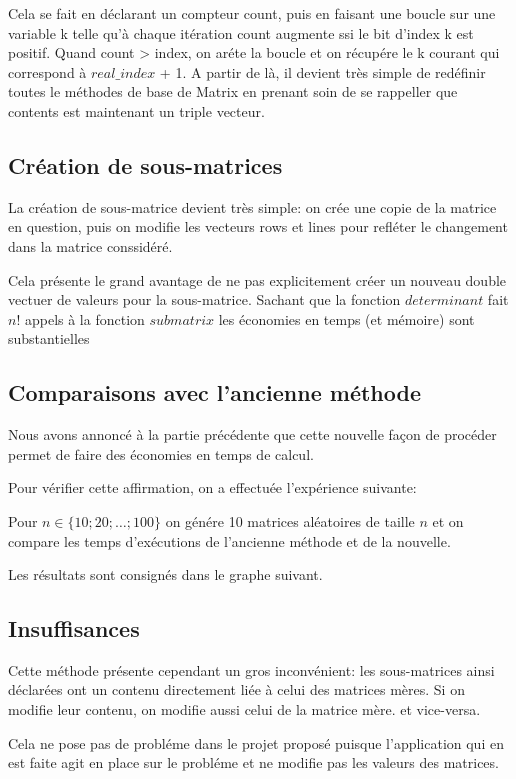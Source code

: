 \documentclass[a4paper,11pt]{article}
\begin{document}
Cela se fait en déclarant un compteur count, puis en faisant une boucle sur une variable k telle qu'à chaque itération count augmente ssi le bit d'index k est positif. Quand count > index, on aréte la boucle
et on récupére le k courant qui correspond à $real\_index$ + 1. 
A partir de là, il devient très simple de redéfinir toutes le méthodes de base de Matrix en prenant soin de se rappeller que contents est maintenant un triple vecteur.

\subsection{Création de sous-matrices}

La création de sous-matrice devient très simple: on crée une copie de la matrice en question, puis on modifie les vecteurs rows et lines pour refléter le changement dans la matrice conssidéré.

Cela présente le grand avantage de ne pas explicitement créer un nouveau double vectuer de valeurs pour la sous-matrice. Sachant que la fonction $determinant$ fait $n$! appels à la fonction $submatrix$ les économies en temps (et mémoire) sont substantielles


\subsection{Comparaisons avec l'ancienne méthode}

Nous avons annoncé à la partie précédente que cette nouvelle façon de procéder permet de faire des économies en temps de calcul.

Pour vérifier cette affirmation, on a effectuée l'expérience suivante:

Pour $n \in \{10;20;\dots;100\}$ on génére 10 matrices aléatoires de taille $n$ et on compare les temps d'exécutions de l'ancienne méthode et de la nouvelle.

Les résultats sont consignés dans le graphe suivant.


\subsection{Insuffisances}

Cette méthode présente cependant un gros inconvénient: les sous-matrices ainsi déclarées ont un contenu directement liée à celui des matrices mères. Si on modifie leur contenu, on modifie aussi celui de la matrice mère. et vice-versa.

Cela ne pose pas de probléme dans le projet proposé puisque l'application qui en est faite agit en place sur le probléme et ne modifie pas les valeurs des matrices.
\end{document}
